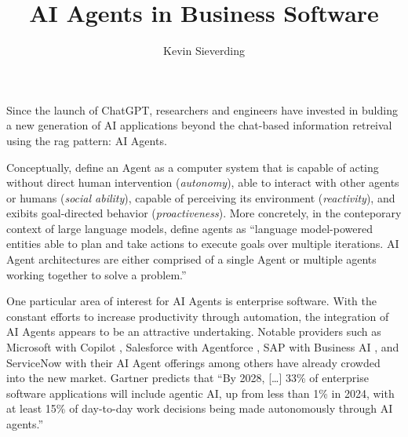 \documentclass[
  paper=a4,
  parskip=half,
  fontsize=12pt,
  listof=toc,
  titlepage,
  headsepline,
  footsepline,
]{scrartcl}
\author{Kevin Sieverding}
\title{AI Agents in Business Software}
\begin{document}

\maketitle

\clearpage

\addtocounter{frontpagecount}{\value{page}}

\clearpage



\pagestyle{scrheadings}

\setcounter{page}{1}


Since the launch of ChatGPT, researchers and engineers have invested in bulding a new generation of AI applications beyond the chat-based information retreival using the \gls{rag} pattern: AI Agents.
\parencite{mastermanLandscapeEmergingAI2024}

Conceptually, \cite{wooldridgeIntelligentAgentsTheory1995} define an Agent as a computer system that is capable of acting without direct human intervention (\textit{autonomy}), able to interact with other agents or humans (\textit{social ability}), capable of perceiving its environment (\textit{reactivity}), and exibits goal-directed behavior (\textit{proactiveness}).
More concretely, in the conteporary context of large language models, \cite{mastermanLandscapeEmergingAI2024} define agents as \enquote{language model-powered entities able to plan and take actions to execute goals over multiple iterations. AI Agent architectures are either comprised of a single Agent or multiple agents working together to solve a problem.}

One particular area of interest for AI Agents is enterprise software.
With the constant efforts to increase productivity through automation, the integration of AI Agents appears to be an attractive undertaking.
Notable providers such as Microsoft with Copilot \parencite{microsoftMicrosoftCopilotYour}, Salesforce with Agentforce \parencite{salesforceinc.AgentforceCreatePowerful}, SAP with Business AI \parencite{sapseSAPBusinessAI}, and ServiceNow with their AI Agent offerings \parencite{servicenowAIAgents} among others have already crowded into the new market.
Gartner predicts that 
\enquote{By 2028, [\ldots] 33\% of enterprise software applications will include agentic AI, up from less than 1\% in 2024, with at least 15\% of day-to-day work decisions being made autonomously through AI agents.} \parencite{gartnerinc.HowImplementAI2025}
\end{document}
